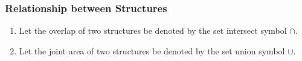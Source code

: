 \documentclass[12pt,twoside]{report}
\begin{document}



\subsubsection{Relationship between Structures}

  \begin{enumerate}
    \item Let the overlap of two structures be denoted by the set intersect symbol $\cap$.
    \item Let the joint area of two structures be denoted by the set union symbol $\cup$.
  \end{enumerate}
\end{document}
